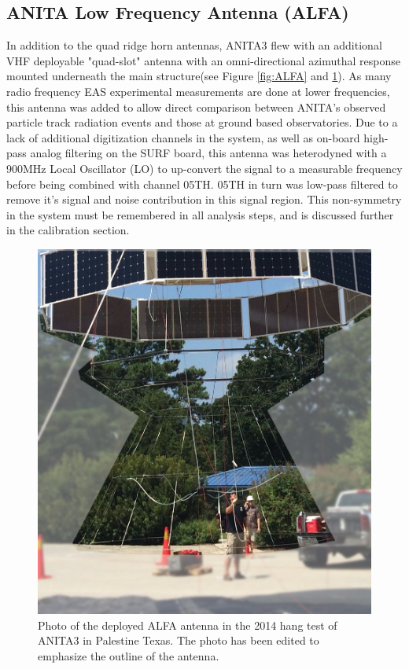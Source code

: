 	
	
	\subsection{ANITA Low Frequency Antenna (ALFA)}
		In addition to the quad ridge horn antennas, ANITA3 flew with an additional VHF deployable "quad-slot" antenna with an omni-directional azimuthal response mounted underneath the main structure(see Figure \ref{fig:ALFA} and \ref{fig:ALFA_pic}).  As many radio frequency EAS experimental measurements are done at lower frequencies, this antenna was added to allow direct comparison between ANITA's observed particle track radiation events and those at ground based observatories.  Due to a lack of additional digitization channels in the system, as well as on-board high-pass analog filtering on the SURF board, this antenna was heterodyned with a 900MHz Local Oscillator (LO) to up-convert the signal to a measurable frequency before being combined with channel 05TH.  05TH in turn was low-pass filtered to remove it's signal and noise contribution in this signal region.  This non-symmetry in the system must be remembered in all analysis steps, and is discussed further in the calibration section.
		
\begin{figure}
\centering
	\includegraphics[width=\textwidth]{figures/ALFA_pic}
	\caption{Photo of the deployed ALFA antenna in the 2014 hang test of ANITA3 in Palestine Texas.  The photo has been edited to emphasize the outline of the antenna.}
	\label{fig:ALFA_pic}
\end{figure}

